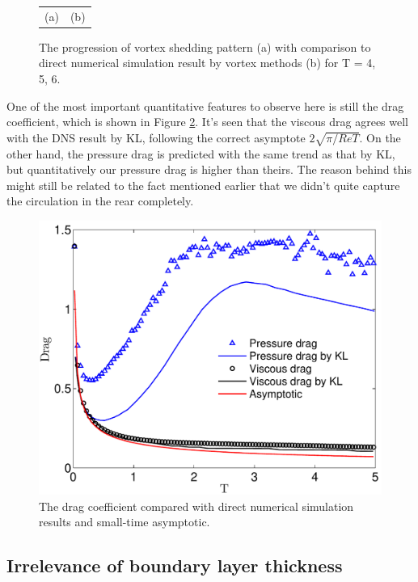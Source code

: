 \begin{figure}
\begin{center}
\begin{tabular}{cc}
 (a) & (b) \\
 \end{tabular}
\end{center}
 \caption[Vortex shedding pattern in the wake]{The progression of vortex shedding pattern (a) with comparison to direct numerical simulation result by vortex methods (b) for T = 4, 5, 6. }
 \label{fig:Wake2}
\end{figure}

One of the most important quantitative features to observe here is still the drag coefficient, which is shown in Figure \ref{fig:Drag}.
It's seen that the viscous drag agrees well with the DNS result by KL, following the correct asymptote $2\sqrt{\pi/ReT}$.
On the other hand, the pressure drag is predicted with the same trend as that by KL, but quantitatively our pressure drag is higher than theirs.
The reason behind this might still be related to the fact mentioned earlier that we didn't quite capture the circulation in the rear completely.

\begin{figure}
\begin{center}
\includegraphics[width=12cm]{./Figures/results/static/Drag.pdf}
\end{center}
\caption[Drag coefficient]{The drag coefficient compared with direct numerical simulation results and small-time asymptotic.}
\label{fig:Drag}
\end{figure}


\subsection{Irrelevance of boundary layer thickness}

